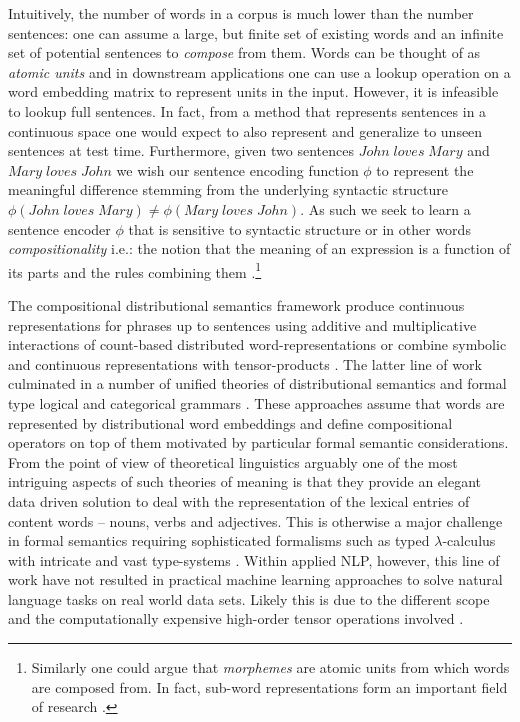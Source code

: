 Intuitively, the number of words in a corpus is much
lower than the number sentences: one can assume a large, but finite set
of existing words and an infinite set of
potential sentences to \emph{compose} from them.
Words can be thought of as \emph{atomic units} and
in downstream applications one can use a lookup operation on a word embedding matrix
to represent units in the input. However, it is infeasible to lookup full sentences.
In fact, from a method that represents sentences in a continuous space one would expect
to also represent and generalize to unseen sentences at test time.
Furthermore, given two sentences $\mathit{John \; loves \; Mary}$ and
$\mathit{Mary \; loves \; John}$ we wish our sentence encoding function
$\phi$ to represent the meaningful difference stemming from the underlying syntactic structure
$\phi(\mathit{John \; loves \; Mary}) \neq \phi(\mathit{Mary \; loves \; John})$.
As such we seek to learn a sentence encoder $\phi$ that is sensitive to
syntactic structure or in other words \emph{compositionality} i.e.:
the notion that the meaning of an expression is
a function of its parts and the rules combining them \citep{montague1970english}.\footnote{Similarly one could argue that \emph{morphemes} are atomic units from which words are composed from. In fact, sub-word
representations form an important field of research \citep{bojanowski2017enriching}.}

The compositional distributional semantics  framework  produce
continuous representations for phrases up to sentences using additive and multiplicative interactions
of count-based distributed word-representations \citep{mitchell2008vector} or combine symbolic and
continuous representations with tensor-products \citep{clark2007combining}.
The latter line of work culminated in a number of unified theories of
distributional semantics and formal type logical and categorical grammars
\citep{coecke2010mathematical,clarke2012context,baroni2014frege}.
These approaches assume that words are represented by distributional word embeddings
and define compositional operators on top of them motivated by particular formal
semantic considerations. From the point of view of theoretical linguistics arguably
one of the most intriguing aspects of such theories of meaning is that
they provide an elegant data driven solution to deal with the representation of the lexical entries of
content words -- nouns, verbs and adjectives. This is  otherwise a major challenge in formal semantics
requiring sophisticated formalisms such as typed $\lambda$-calculus with intricate and vast
type-systems \citep{asher2011lexical}. Within applied NLP, however, this line of work have not resulted in
practical machine learning approaches to solve natural language tasks
on real world data sets. Likely this is due to the different scope and
the computationally expensive high-order
tensor operations involved \citep{bowman2016modeling}.

